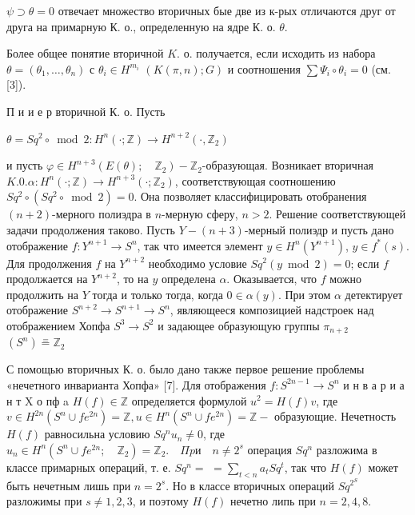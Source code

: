 \documentclass[10pt]{article}
\begin{document}
$\psi \supset \theta=0$ отвечает множество вторичных бые две из к-рых отличаются друг от друга на примарную К. о., определенную на ядре К. о. $\theta$.



Более общее понятие вторичной $K$. о. получается, если исходить из набора $\theta=\left(\theta_{1}, \ldots, \theta_{n}\right)$ с $\theta_{i} \in H^{m_{i}}$ $(K(\pi, n) ; G)$ и соотношения $\sum \Psi_{i} \circ \theta_{i}=0$ (см. [3]).



П и и е р вторичной К. о. Пусть



$\theta=S q^{2} \circ \bmod 2: H^{n}(\cdot ; \mathbb{Z}) \longrightarrow H^{n+2}\left(\cdot, \mathbb{Z}_{2}\right)$



и пусть $\varphi \in H^{n+3}\left(E(\theta) ; \quad \mathbb{Z}_{2}\right)-\mathbb{Z}_{2}$-образующая. Возникает вторичная $K .0 . \alpha: H^{n}(\cdot ; \mathbb{Z}) \rightarrow H^{n+3}\left(\cdot ; \mathbb{Z}_{2}\right)$, соответствующая соотношению $S q^{2} \circ\left(S q^{2} \circ \bmod 2\right)=0$. Она позволяет классифицировать отобранения $(n+2)$-мерного полиэдра в $n$-мерную сферу, $n>2$. Решение соответствующей задачи продолжения таково. Пусть $Y-(n+3)$-мерный полиэдр и пусть дано отображение $f: Y^{n+1} \rightarrow S^{n}$, так что имеется элемент $y \in H^{n}\left(Y^{n+1}\right)$, $y \in f^{*}(s)$. Для продолжения $f$ на $Y^{n+2}$ необходимо условие $S q^{2}(y \bmod 2)=0$; если $f$ продолжается на $Y^{n+2}$, то на $y$ определена $\alpha$. Оказывается, что $f$ можно продолжить на $Y$ тогда и только тогда, когда $0 \in \alpha(y)$. При этом $\alpha$ детектирует отображение $S^{n+2} \rightarrow S^{n+1} \rightarrow S^{n}$, являющееся композицией надстроек над отображением Хопфа $S^{3} \rightarrow S^{2}$ и задающее образующую группы $\pi_{n+2}$ $\left(S^{n}\right) \stackrel{=}{=} \mathbb{Z}_{2}$



С помощью вторичных К. о. было дано также первое решение проблемы «нечетного инварианта Хопфа» [7]. Для отображения $f: S^{2 n-1} \rightarrow S^{n}$ и н в а р и а н т X о пф a $H(f) \in \mathbb{Z}$ определяется формулой $u^{2}=H(f) v$, где $v \in H^{2 n}\left(S^{n} \cup f e^{2 n}\right)=\mathbb{Z}, u \in H^{n}\left(S^{n} \cup f e^{2 n}\right)=\mathbb{Z}-$ образующие. Нечетность $H(f)$ равносильна условию $S q^{n} u_{n} \neq 0$, где $u_{n} \in H^{n}\left(S^{n} \cup f e^{2 n} ; \quad \mathbb{Z}_{2}\right)=\mathbb{Z}_{2} . \quad \Pi p и \quad n \neq 2^{s}$ операция $S q^{n}$ разложима в классе примарных операций, т. е. $S q^{n}=$ $=\sum_{t<n} a_{t} S q^{t}$, так что $H(f)$ может быть нечетным лишь при $n=2^{s}$. Но в классе вторичных операций $S q^{2^{S}}$ разложимы при $s \neq 1,2,3$, и поэтому $H(f)$ нечетно липь при $n=2,4,8$.
\end{document}
